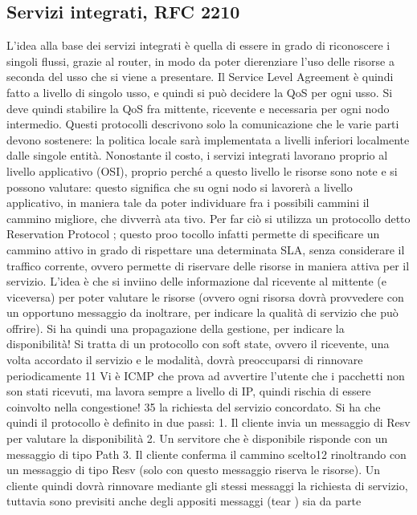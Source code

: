 \subsection{Servizi integrati, RFC 2210}
L'idea alla base dei servizi integrati è quella di essere in grado di riconoscere i
singoli flussi, grazie al router, in modo da poter dierenziare l'uso delle risorse
a seconda del usso che si viene a presentare. Il Service Level Agreement è
quindi fatto a livello di singolo usso, e quindi si può decidere la QoS per ogni
usso. Si deve quindi stabilire la QoS fra mittente, ricevente e necessaria per
ogni nodo intermedio. Questi protocolli descrivono solo la comunicazione che
le varie parti devono sostenere: la politica locale sarà implementata a livelli
inferiori localmente dalle singole entità.
Nonostante il costo, i servizi integrati lavorano proprio al livello applicativo
(OSI), proprio perché a questo livello le risorse sono note e si possono valutare:
questo significa che su ogni nodo si lavorerà a livello applicativo, in maniera tale
da poter individuare fra i possibili cammini il cammino migliore, che divverrà ata
tivo. Per far ciò si utilizza un protocollo detto Reservation Protocol ; questo proo
tocollo infatti permette di specificare un cammino attivo in grado di rispettare
una determinata SLA, senza considerare il traffico corrente, ovvero permette di
riservare delle risorse in maniera attiva per il servizio. L'idea è che si inviino
delle informazione dal ricevente al mittente (e viceversa) per poter valutare le
risorse (ovvero ogni risorsa dovrà provvedere con un opportuno messaggio da
inoltrare, per indicare la qualità di servizio che può offrire). Si ha quindi una
propagazione della gestione, per indicare la disponibilità!
Si tratta di un protocollo con soft state, ovvero il ricevente, una volta accordato il servizio e le modalità, dovrà
preoccuparsi di rinnovare periodicamente
11 Vi è ICMP che prova ad avvertire l'utente che i pacchetti non son stati ricevuti, ma lavora
sempre a livello di IP, quindi rischia di essere coinvolto nella congestione!
35
la richiesta del servizio concordato. Si ha che quindi il protocollo è definito in
due passi:
1. Il cliente invia un messaggio di Resv per valutare la disponibilità
2. Un servitore che è disponibile risponde con un messaggio di tipo Path
3. Il cliente conferma il cammino scelto12 rinoltrando con un messaggio di
tipo Resv (solo con questo messaggio riserva le risorse).
Un cliente quindi dovrà rinnovare mediante gli stessi messaggi la richiesta di
servizio, tuttavia sono previsiti anche degli appositi messaggi (tear ) sia da parte
